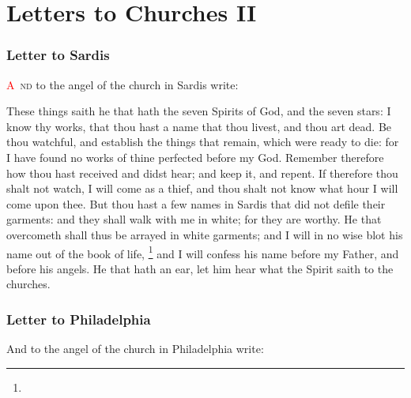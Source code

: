 \chapter{Letters to Churches II}
\subsection*{Letter to Sardis}
\lettrine[lines=3]{\textcolor{red}{A}}{\ nd} to the angel of the church in Sardis write:

\zz These things saith he that hath the seven Spirits of God, and the seven stars: I know thy works, that thou hast a name that thou livest, and thou art dead. %
Be thou watchful, and establish the things that remain, which were ready to die: for I have found no works of thine perfected before my God. %
Remember therefore how thou hast received and didst hear; and keep it, and repent. If therefore thou shalt not watch, I will come as a thief, and thou shalt not know what hour I will come upon thee. %
But thou hast a few names in Sardis that did not defile their garments: and they shall walk with me in white; for they are worthy. %
He that overcometh shall thus be arrayed in white garments; and I will in no wise blot his name out of the book of life,%
	\footnote{ %
			} %
and I will confess his name before my Father, and before his angels. %
He that hath an ear, let him hear what the Spirit saith to the churches.
\subsection*{Letter to Philadelphia}
And to the angel of the church in Philadelphia write:

